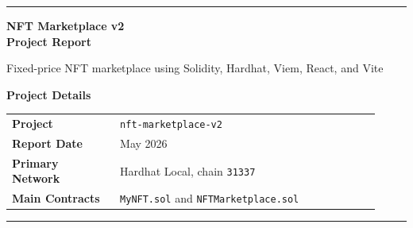 \documentclass[11pt,a4paper]{article}
\newcommand{\code}[1]{\texttt{#1}}
\begin{document}
\begin{titlepage}
    \thispagestyle{empty}
    \vspace*{0.35cm}
    {\color{accent}\rule{\linewidth}{1.2pt}}
    \vspace{1.0cm}

    {\Huge\bfseries\color{ink} NFT Marketplace v2\\[0.25em] Project Report\par}
    \vspace{0.35cm}
    {\Large\color{muted} Fixed-price NFT marketplace using Solidity, Hardhat, Viem, React, and Vite\par}

    \vfill


    \vspace{0.75cm}

    {\color{accentdark}\textbf{Project Details}}
    \vspace{0.25em}

    \begin{tabular}{@{}p{0.27\linewidth}p{0.65\linewidth}@{}}
        \toprule
        \textbf{Project} & \code{nft-marketplace-v2} \\
        \textbf{Report Date} & May 2026 \\
        \textbf{Primary Network} & Hardhat Local, chain \code{31337} \\
        \textbf{Main Contracts} & \code{MyNFT.sol} and \code{NFTMarketplace.sol} \\
        \bottomrule
    \end{tabular}

    \vspace{1.15cm}
    {\color{accent}\rule{\linewidth}{1.2pt}}
\end{titlepage}
\end{document}

